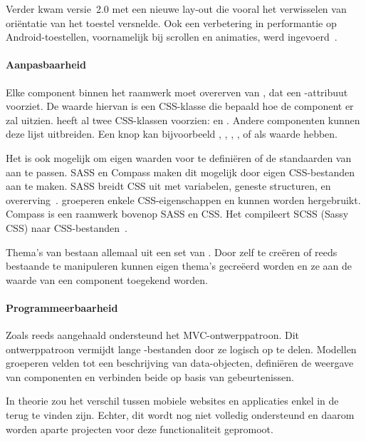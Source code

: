 Verder kwam versie~2.0 met een nieuwe lay-out  die vooral het verwisselen van oriëntatie van het toestel versnelde.  
Ook een verbetering in performantie op Android-toestellen,  voornamelijk bij scrollen en animaties,  werd ingevoerd~\cite{Inc.}.

\paragraph{Aanpasbaarheid}
\label{sec:sencha-aanpasbaarheid}
Elke component binnen het raamwerk moet overerven van , dat een -attribuut voorziet.  
De waarde hiervan is een CSS-klasse die bepaald hoe de component er zal uitzien.  
\st{} heeft al twee CSS-klassen voorzien:   en .  
Andere componenten kunnen deze lijst uitbreiden.  
Een knop kan bijvoorbeeld ,  ,  ,  ,   of  als  waarde hebben.

Het is ook mogelijk om eigen waarden voor  te definiëren of de standaarden van \st{} aan te passen.  
SASS en Compass maken dit mogelijk door eigen CSS-bestanden aan te maken.  
SASS breidt CSS uit met variabelen,  geneste structuren,  en overerving~\cite{Eppstein2013}.  
 groeperen enkele CSS-eigenschappen en kunnen worden hergebruikt.  
Compass is een raamwerk bovenop SASS en CSS.  
Het compileert SCSS (Sassy CSS) naar CSS-bestanden~\cite{Eppstein2013a}.        

Thema's van \st{} bestaan allemaal uit een set van .  
Door zelf  te creëren of reeds bestaande te manipuleren kunnen eigen thema's gecreëerd worden en ze aan de  waarde van een component toegekend worden.

\paragraph{Programmeerbaarheid}
\label{sec:sencha-programmeerbaarheid}
Zoals reeds aangehaald ondersteund \st{} het MVC-ontwerppatroon.  
Dit ontwerppatroon vermijdt lange \js{}-bestanden door ze logisch op te delen.  
Modellen groeperen velden tot een beschrijving van data-objecten,  definiëren de weergave van componenten en  verbinden beide op basis van gebeurtenissen.

In theorie zou het verschil tussen mobiele websites en applicaties enkel in de  terug te vinden zijn.  
Echter,  dit wordt nog niet volledig ondersteund en daarom worden aparte projecten voor deze functionaliteit gepromoot.

